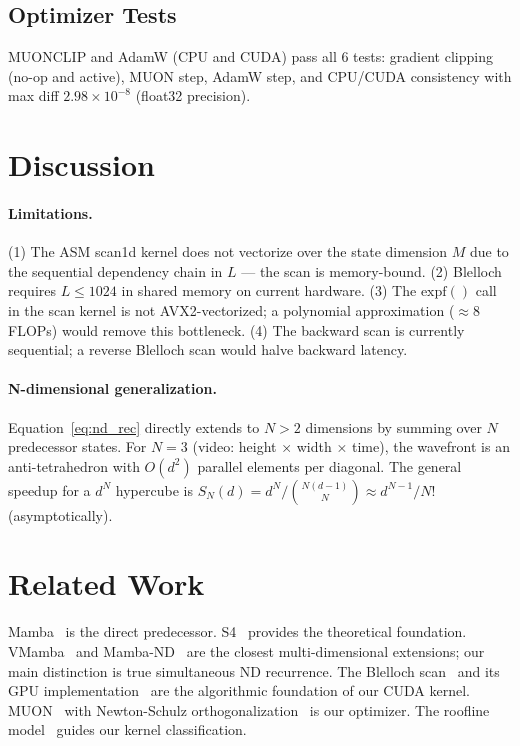 \documentclass[10pt,onecolumn]{article}
\begin{document}
\subsection{Optimizer Tests}

MUONCLIP and AdamW (CPU and CUDA) pass all 6 tests:
gradient clipping (no-op and active), MUON step, AdamW step,
and CPU/CUDA consistency with max diff $2.98 \times 10^{-8}$ (float32 precision).

\section{Discussion}

\paragraph{Limitations.}
(1) The ASM scan1d kernel does not vectorize over the state dimension $M$
due to the sequential dependency chain in $L$ — the scan is memory-bound.
(2) Blelloch requires $L \leq 1024$ in shared memory on current hardware.
(3) The $\text{expf}()$ call in the scan kernel is not AVX2-vectorized;
a polynomial approximation ($\approx 8$ FLOPs) would remove this bottleneck.
(4) The backward scan is currently sequential; a reverse Blelloch scan
would halve backward latency.

\paragraph{N-dimensional generalization.}
Equation~\eqref{eq:nd_rec} directly extends to $N > 2$ dimensions
by summing over $N$ predecessor states.
For $N = 3$ (video: height × width × time), the wavefront is
an anti-tetrahedron with $O(d^2)$ parallel elements per diagonal.
The general speedup for a $d^N$ hypercube is
$S_N(d) = d^N / \binom{N(d-1)}{N} \approx d^{N-1}/N!$
(asymptotically).

\section{Related Work}

Mamba~\cite{mamba2023} is the direct predecessor.
S4~\cite{s4} provides the theoretical foundation.
VMamba~\cite{vmamba} and Mamba-ND~\cite{mamband} are the closest
multi-dimensional extensions; our main distinction is true simultaneous ND recurrence.
The Blelloch scan~\cite{blelloch1990} and its GPU implementation~\cite{harris2007gpu}
are the algorithmic foundation of our CUDA kernel.
MUON~\cite{muon2025} with Newton-Schulz orthogonalization~\cite{bjorck1971}
is our optimizer.
The roofline model~\cite{williams2009roofline} guides our kernel classification.
\end{document}
